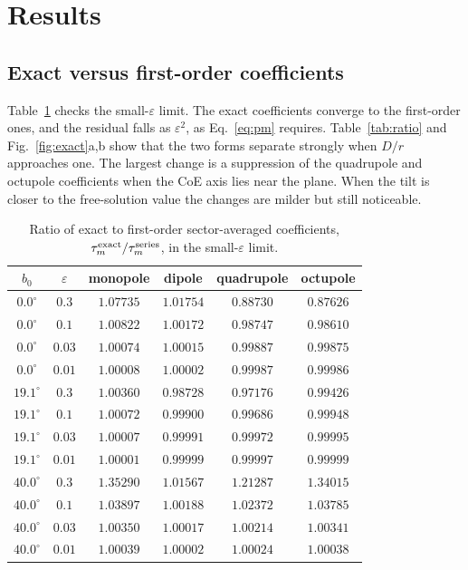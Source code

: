 \documentclass[10pt]{article}
\begin{document}
\section{Results}
\subsection{Exact versus first-order coefficients}
Table~\ref{tab:limit} checks the small-$\varepsilon$ limit. The exact coefficients converge to the first-order ones, and the residual falls as $\varepsilon^2$, as Eq.~\eqref{eq:pm} requires. Table~\ref{tab:ratio} and Fig.~\ref{fig:exact}a,b show that the two forms separate strongly when $D/r$ approaches one. The largest change is a suppression of the quadrupole and octupole coefficients when the CoE axis lies near the plane. When the tilt is closer to the free-solution value the changes are milder but still noticeable.

\begin{table}[!htb]\centering\small
\caption{Ratio of exact to first-order sector-averaged coefficients, $\tau_m^{\rm exact}/\tau_m^{\rm series}$, in the small-$\varepsilon$ limit.}\label{tab:limit}
\begin{tabular}{cccccc}\toprule
$b_0$ & $\varepsilon$ & monopole & dipole & quadrupole & octupole\\\midrule

$0.0^\circ$ & $0.3$ & $1.07735$ & $1.01754$ & $0.88730$ & $0.87626$\\
$0.0^\circ$ & $0.1$ & $1.00822$ & $1.00172$ & $0.98747$ & $0.98610$\\
$0.0^\circ$ & $0.03$ & $1.00074$ & $1.00015$ & $0.99887$ & $0.99875$\\
$0.0^\circ$ & $0.01$ & $1.00008$ & $1.00002$ & $0.99987$ & $0.99986$\\
$19.1^\circ$ & $0.3$ & $1.00360$ & $0.98728$ & $0.97176$ & $0.99426$\\
$19.1^\circ$ & $0.1$ & $1.00072$ & $0.99900$ & $0.99686$ & $0.99948$\\
$19.1^\circ$ & $0.03$ & $1.00007$ & $0.99991$ & $0.99972$ & $0.99995$\\
$19.1^\circ$ & $0.01$ & $1.00001$ & $0.99999$ & $0.99997$ & $0.99999$\\
$40.0^\circ$ & $0.3$ & $1.35290$ & $1.01567$ & $1.21287$ & $1.34015$\\
$40.0^\circ$ & $0.1$ & $1.03897$ & $1.00188$ & $1.02372$ & $1.03785$\\
$40.0^\circ$ & $0.03$ & $1.00350$ & $1.00017$ & $1.00214$ & $1.00341$\\
$40.0^\circ$ & $0.01$ & $1.00039$ & $1.00002$ & $1.00024$ & $1.00038$\\
\bottomrule
\end{tabular}
\end{table}
\end{document}
